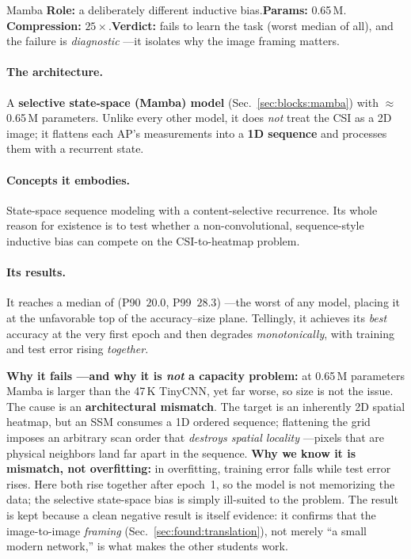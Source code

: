 \begin{ataglance}{Mamba}
\textbf{Role:} a deliberately different inductive bias.\quad \textbf{Params:} 0.65\,M.\quad
\textbf{Compression:} $25\times$.\quad \textbf{Verdict:} fails to learn the task (worst median of all),
and the failure is \emph{diagnostic} ---it isolates why the image framing matters.
\end{ataglance}

\paragraph{The architecture.} A \textbf{selective state-space (Mamba) model}
(Sec.~\ref{sec:blocks:mamba}) with $\approx$0.65\,M parameters. Unlike every other model, it does
\emph{not} treat the CSI as a 2D image; it flattens each AP's measurements into a \textbf{1D sequence}
and processes them with a recurrent state.

\paragraph{Concepts it embodies.} State-space sequence modeling with a content-selective recurrence.
Its whole reason for existence is to test whether a non-convolutional, sequence-style inductive bias
can compete on the CSI-to-heatmap problem.

\paragraph{Its results.} It reaches a median of  (P90~$20.0$, P99~$28.3$) ---the worst
of any model, placing it at the unfavorable top of the accuracy--size plane. Tellingly, it achieves
its \emph{best} accuracy at the very first epoch and then degrades \emph{monotonically}, with training
and test error rising \emph{together}.

\begin{whybox}
\textbf{Why it fails ---and why it is \emph{not} a capacity problem:} at 0.65\,M parameters Mamba is
larger than the 47\,K TinyCNN, yet far worse, so size is not the issue. The cause is an
\textbf{architectural mismatch}. The target is an inherently 2D spatial heatmap, but an SSM consumes a
1D ordered sequence; flattening the grid imposes an arbitrary scan order that \emph{destroys spatial
locality} ---pixels that are physical neighbors land far apart in the sequence. \textbf{Why we know it
is mismatch, not overfitting:} in overfitting, training error falls while test error rises. Here both
rise together after epoch~1, so the model is not memorizing the data; the selective state-space bias
is simply ill-suited to the problem. The result is kept because a clean negative result is itself
evidence: it confirms that the image-to-image \emph{framing} (Sec.~\ref{sec:found:translation}), not
merely ``a small modern network,'' is what makes the other students work.
\end{whybox}

